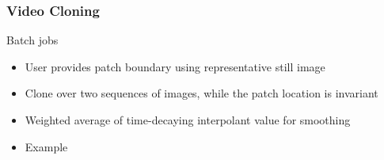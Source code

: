 \documentclass{beamer}
\theoremstyle{remark}
\begin{document}
\begin{frame}[t]
\frametitle{Video Cloning}
\begin{block}{Batch jobs}
\begin{itemize}
\pause
\item User provides patch boundary using representative still image
\pause
 \item Clone over two sequences of images, while the patch location is invariant
 \pause
 \item Weighted average of time-decaying interpolant value for smoothing
 \pause
 \item Example
\end{itemize}
\end{block}
\end{frame}
\end{document}
